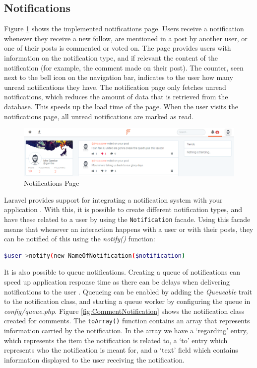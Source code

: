 \subsection{Notifications}
Figure \ref{fig:NotificationsPage} shows the implemented notifications page. Users receive a notification whenever they receive a new follow, are mentioned in a post by another user, or one of their posts is commented or voted on. The page provides users with information on the notification type, and if relevant the content of the notification (for example, the comment made on their post). The counter, seen next to the bell icon on the navigation bar, indicates to the user how many unread notifications they have. The notification page only fetches unread notifications, which reduces the amount of data that is retrieved from the database. This speeds up the load time of the page. When the user visits the notifications page, all unread notifications are marked as read. 

\begin{figure}[H]
\centering
\includegraphics[width=\textwidth]{Images/Implementation/NotificationsPage}
\caption{Notifications Page}
\label{fig:NotificationsPage}
\end{figure}

Laravel provides support for integrating a notification system with your application \cite{Laravel:Notifications}. With this, it is possible to create different notification types, and have these related to a user by using the \texttt{Notification} facade. Using this facade means that whenever an interaction happens with a user or with their posts, they can be notified of this using the \textit{notify()} function:

\begin{lstlisting}[language=bash]
	$user->notify(new NameOfNotification($notification)
\end{lstlisting}

It is also possible to queue notifications. Creating a queue of notifications can speed up application response time as there can be delays when delivering notifications to the user \cite{Laravel:Notifications, Laravel:Queues}. Queueing can be enabled by adding the \textit{Queueable} trait to the notification class, and starting a queue worker by configuring the queue in \textit{config/queue.php}. Figure \ref{fig:CommentNotification} shows the notification class created for comments. The \texttt{toArray()} function contains an array that represents information carried by the notification. In the array we have a `regarding' entry, which represents the item the notification is related to, a `to' entry which represents who the notification is meant for, and a `text' field which contains information displayed to the user receiving the notification.

